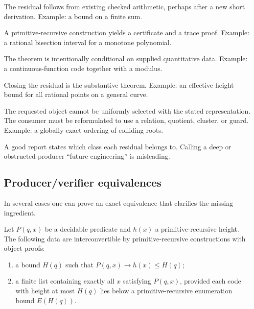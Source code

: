 \begin{description}[style=nextline,leftmargin=2.8em]
\item[Arithmetic producer.]  The residual follows from existing checked arithmetic, perhaps after a new short derivation.  Example: a bound on a finite sum.

\item[Algorithmic producer.]  A primitive-recursive construction yields a certificate and a trace proof.  Example: a rational bisection interval for a monotone polynomial.

\item[Input contract.]  The theorem is intentionally conditional on supplied quantitative data.  Example: a continuous-function code together with a modulus.

\item[Deep mathematical producer.]  Closing the residual is the substantive theorem.  Example: an effective height bound for all rational points on a general curve.

\item[Obstructed producer.]  The requested object cannot be uniformly selected with the stated representation.  The consumer must be reformulated to use a relation, quotient, cluster, or guard.  Example: a globally exact ordering of colliding roots.
\end{description}

A good report states which class each residual belongs to.  Calling a deep or obstructed producer ``future engineering'' is misleading.

\subsection{Producer/verifier equivalences}

In several cases one can prove an exact equivalence that clarifies the missing ingredient.

\begin{theorem}
\label{thm:height-list}
Let \(P(q,x)\) be a decidable predicate and \(h(x)\) a primitive-recursive height.  The following data are interconvertible by primitive-recursive constructions with object proofs:
\begin{enumerate}[label=(\roman*),leftmargin=2.3em]
\item a bound \(H(q)\) such that \(P(q,x)\to h(x)\leq H(q)\);
\item a finite list containing exactly all \(x\) satisfying \(P(q,x)\), provided each code with height at most \(H(q)\) lies below a primitive-recursive enumeration bound \(E(H(q))\).
\end{enumerate}
\end{theorem}

